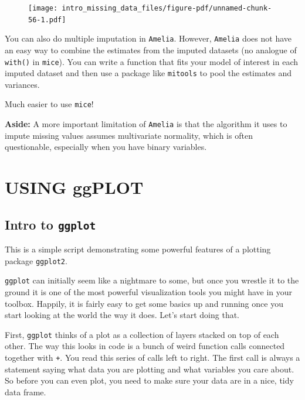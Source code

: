 \documentclass[
  letterpaper,
  DIV=11,
  numbers=noendperiod]{scrreprt}
\begin{document}
\begin{figure}[H]

{\centering \texttt{[image: intro\_missing\_data\_files/figure-pdf/unnamed-chunk-56-1.pdf]}

}

\end{figure}

You can also do multiple imputation in \texttt{Amelia}. However,
\texttt{Amelia} does not have an easy way to combine the estimates from
the imputed datasets (no analogue of \texttt{with()} in \texttt{mice}).
You can write a function that fits your model of interest in each
imputed dataset and then use a package like \texttt{mitools} to pool the
estimates and variances.

Much easier to use \texttt{mice}!

\textbf{Aside:} A more important limitation of \texttt{Amelia} is that
the algorithm it uses to impute missing values assumes multivariate
normality, which is often questionable, especially when you have binary
variables.

\part{USING ggPLOT}

\hypertarget{intro-to-ggplot}{%
\chapter{\texorpdfstring{Intro to
\texttt{ggplot}}{Intro to ggplot}}\label{intro-to-ggplot}}

This is a simple script demonstrating some powerful features of a
plotting package \texttt{ggplot2}.

\texttt{ggplot} can initially seem like a nightmare to some, but once
you wrestle it to the ground it is one of the most powerful
visualization tools you might have in your toolbox. Happily, it is
fairly easy to get some basics up and running once you start looking at
the world the way it does. Let's start doing that.

First, \texttt{ggplot} thinks of a plot as a collection of layers
stacked on top of each other. The way this looks in code is a bunch of
weird function calls connected together with \texttt{+}. You read this
series of calls left to right. The first call is always a statement
saying what data you are plotting and what variables you care about. So
before you can even plot, you need to make sure your data are in a nice,
tidy data frame.
\end{document}
